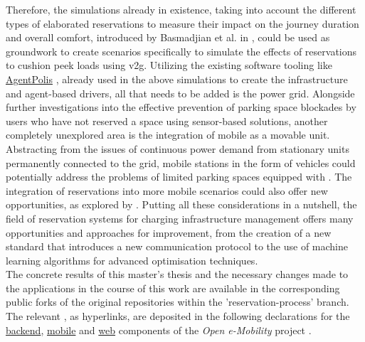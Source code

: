 Therefore, the simulations already in existence, taking into account the different types of elaborated reservations to measure their impact on the journey duration and overall comfort, introduced by Basmadjian et al. in \cite{basmadjian_reference_2020,basmadjian_interoperable_2019}, could be used as groundwork to create scenarios specifically to simulate the effects of reservations to cushion peek loads using \acrshort{v2g}.
Utilizing the existing software tooling like \href{https://github.com/aicenter/agentpolis}{AgentPolis} \cite{noauthor_agentpolis_2022}, already used in the above simulations to create the infrastructure and agent-based drivers, all that needs to be added is the power grid.
Alongside further investigations into the effective prevention of parking space blockades by users who have not reserved a space using sensor-based solutions, another completely unexplored area is the integration of mobile  as a movable unit.
Abstracting from the issues of continuous power demand from stationary units permanently connected to the grid, mobile stations in the form of vehicles could potentially address the problems of limited parking spaces equipped with . The integration of reservations into more mobile scenarios could also offer new opportunities, as explored by \cite{zhang_mobile_2020}.
Putting all these considerations in a nutshell, the field of reservation systems for charging infrastructure management offers many opportunities and approaches for improvement, from the creation of a new standard that introduces a new communication protocol to the use of machine learning algorithms for advanced optimisation techniques. \\
The concrete results of this master's thesis and the necessary changes made to the applications in the course of this work are available in the corresponding public forks of the original repositories within the 'reservation-process' branch. The relevant , as hyperlinks, are deposited in the following declarations for the \href{https://github.com/JulianHBuecher/ev-server/tree/reservation-process}{backend}, \href{https://github.com/JulianHBuecher/ev-mobile/tree/reservation-process}{mobile} and \href{https://github.com/JulianHBuecher/ev-dashboard/tree/reservation-process}{web} components of the \textit{Open e-Mobility} project \cite{noauthor_github_nodate,noauthor_github_nodate-1,noauthor_github_nodate-2}. 
